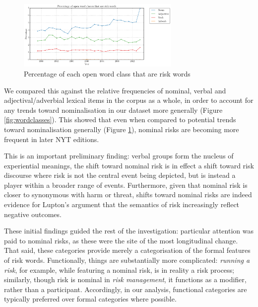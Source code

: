     \begin{figure}[htb!]
    \centering
    \includegraphics[width=0.7\textwidth]{../images/percentage-of-open-word-classes-that-are-risk-words.png}
    \caption{Percentage of each open word class that are risk words}
    \label{fig:eachperc}
    \end{figure}




    We compared this against the relative frequencies of nominal, verbal and adjectival\slash adverbial lexical items in the corpus as a whole, in order to account for any trends toward nominalisation in our dataset more generally (Figure \ref{fig:wordclasses}). This showed that even when compared to potential trends toward nominalisation generally (Figure \ref{fig:eachperc}), nominal risks are becoming more frequent in later NYT editions. 

    This is an important preliminary finding: verbal groups form the nucleus of experiential meanings, the shift toward nominal risk is in effect a shift toward risk discourse where risk is not the central event being depicted, but is instead a player within a broader range of events. Furthermore, given that nominal risk is closer to synonymous with harm or threat, shifts toward nominal risks are indeed evidence for Lupton's argument that the semantics of risk increasingly reflect negative outcomes.


    These initial findings guided the rest of the investigation: particular attention was paid to nominal risks, as these were the site of the most longitudinal change. That said, these categories provide merely a categorisation of the formal features of risk words. Functionally, things are substantially more complicated: \emph{running a risk}, for example, while featuring a nominal risk, is in reality a risk process; similarly, though risk is nominal in \emph{risk management}, it functions as a modifier, rather than a participant. Accordingly, in our analysis, functional categories are typically preferred over formal categories where possible.

